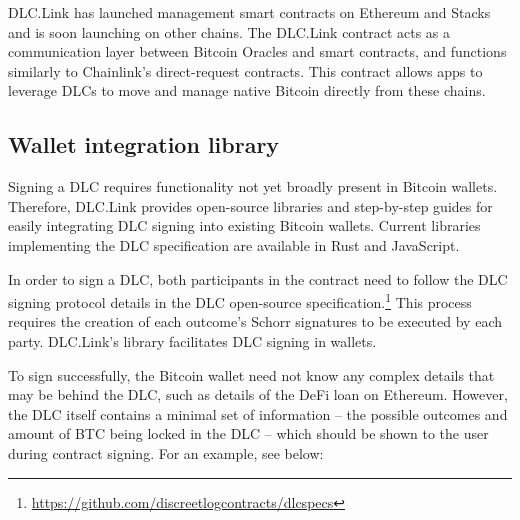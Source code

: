 \documentclass[twoside, a4paper, 11pt]{article}
\begin{document}
  DLC.Link has launched management smart contracts on Ethereum and Stacks and is soon launching on other chains. The DLC.Link contract acts as a communication layer between Bitcoin Oracles and smart contracts, and functions similarly to Chainlink’s direct-request contracts. This contract allows apps to leverage DLCs to move and manage native Bitcoin directly from these chains.

  \subsection{Wallet integration library}

  Signing a DLC requires functionality not yet broadly present in Bitcoin wallets. Therefore, DLC.Link provides open-source libraries and step-by-step guides for easily integrating DLC signing into existing Bitcoin wallets. Current libraries implementing the DLC specification are available in Rust and JavaScript.

  In order to sign a DLC, both participants in the contract need to follow the DLC signing protocol details in the DLC open-source specification.\footnote{\url{https://github.com/discreetlogcontracts/dlcspecs}} This process requires the creation of each outcome’s Schorr signatures to be executed by each party. DLC.Link’s library facilitates DLC signing in wallets.

  To sign successfully, the Bitcoin wallet need not know any complex details that may be behind the DLC, such as details of the DeFi loan on Ethereum. However, the DLC itself contains a minimal set of information – the possible outcomes and amount of BTC being locked in the DLC – which should be shown to the user during contract signing. For an example, see below:
\end{document}
